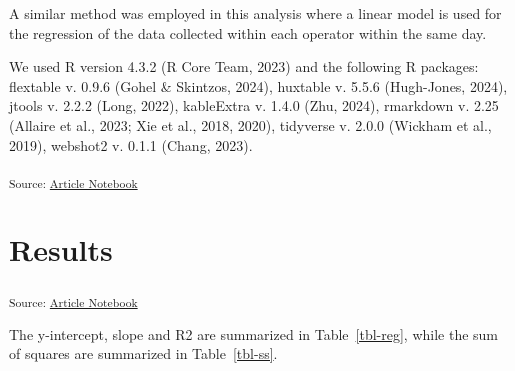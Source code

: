 \documentclass[
]{agujournal2019}
\begin{document}
A similar method was employed in this analysis where a linear model is
used for the regression of the data collected within each operator
within the same day.

We used R version 4.3.2 (R Core Team, 2023) and the following R
packages: flextable v. 0.9.6 (Gohel \& Skintzos, 2024), huxtable v.
5.5.6 (Hugh-Jones, 2024), jtools v. 2.2.2 (Long, 2022), kableExtra v.
1.4.0 (Zhu, 2024), rmarkdown v. 2.25 (Allaire et al., 2023; Xie et al.,
2018, 2020), tidyverse v. 2.0.0 (Wickham et al., 2019), webshot2 v.
0.1.1 (Chang, 2023).

\textsubscript{Source:
\href{https://jinkaiteo.github.io/quarto-template/index.qmd.html}{Article
Notebook}}

\section{Results}\label{results}

\textsubscript{Source:
\href{https://jinkaiteo.github.io/quarto-template/index.qmd.html}{Article
Notebook}}

The y-intercept, slope and R2 are summarized in Table~\ref{tbl-reg},
while the sum of squares are summarized in Table~\ref{tbl-ss}.
\end{document}
